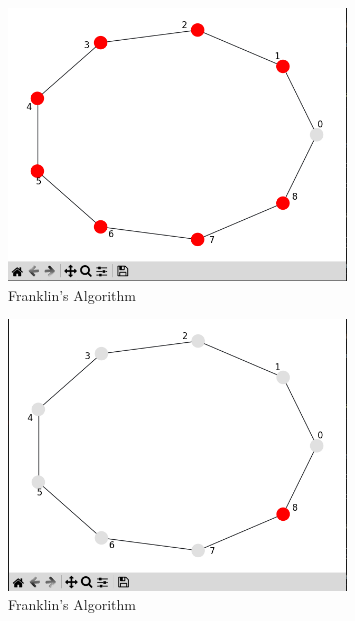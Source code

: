 \documentclass[11pt]{beamer}              %
\begin{document}
\begin{frame}
\begin{figure}
    \centering
    \includegraphics[width=0.8\textwidth]{figures/algo2f.png}
    \caption{Franklin's Algorithm}
\end{figure}
\end{frame}

\begin{frame}
\begin{figure}
    \centering
    \includegraphics[width=0.8\textwidth]{figures/algo3f.png}
    \caption{Franklin's Algorithm}
\end{figure}
\end{frame}
\end{document}
